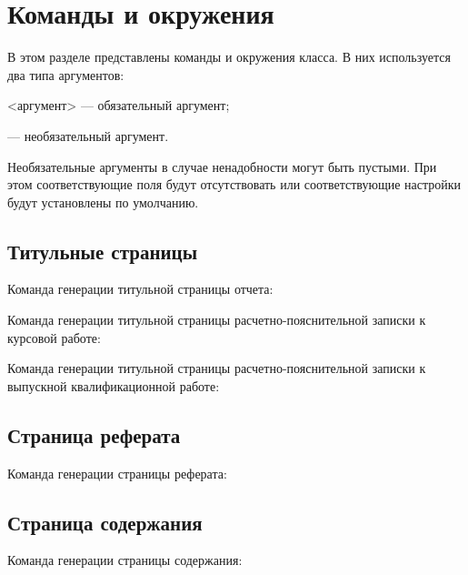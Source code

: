 \documentclass{bmstu}
\begin{document}
\chapter{Команды и окружения}

В этом разделе представлены команды и окружения класса. В них используется два типа аргументов:

{\color{red} \ttfamily <аргумент>} --- обязательный аргумент;

{\color{darkgray} \ttfamily [аргумент]} --- необязательный аргумент.

Необязательные аргументы в случае ненадобности могут быть пустыми. При этом соответствующие поля будут отсутствовать или соответствующие настройки будут установлены по умолчанию.

\section{Титульные страницы}

Команда генерации титульной страницы отчета:

Команда генерации титульной страницы расчетно-пояснительной записки к курсовой работе:

Команда генерации титульной страницы расчетно-пояснительной записки к выпускной квалификационной работе:

\section{Страница реферата}

Команда генерации страницы реферата:

\section{Страница содержания}
Команда генерации страницы содержания:
\end{document}
